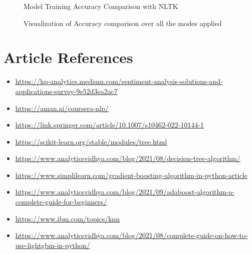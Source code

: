 \documentclass[a4paper]{article}
\theoremstyle{plain}
\theoremstyle{definition}
\begin{document}
\begin{figure}[htbp]
\begin{minipage}[b]{0.3\textwidth}
        \caption*{Model Training Accuracy Comparison with NLTK}
        \label{fig:figure5}
    \end{minipage}
    
    \caption{Visualization of Accuracy comparison over all the modes applied}
    \label{fig:dataset_figures}
\end{figure}
\cite{wang2014sentiment}
\cite{dang2020sentiment}
\cite{pang2002thumbs}
\cite{tang2014learning}

	

\section{{Article References}}

\begin{itemize}
    
    \item \url{https://hp-analytics.medium.com/sentiment-analysis-solutions-and-applications-survey-9e52d3ea2ac7}
    \item \url{https://aman.ai/coursera-nlp/}\item \url{https://link.springer.com/article/10.1007/s10462-022-10144-1}
    \item \url{https://scikit-learn.org/stable/modules/tree.html}
    \item \url{https://www.analyticsvidhya.com/blog/2021/08/decision-tree-algorithm/}
    \item \url{https://www.simplilearn.com/gradient-boosting-algorithm-in-python-article}
    \item \url{https://www.analyticsvidhya.com/blog/2021/09/adaboost-algorithm-a-complete-guide-for-beginners/}
    \item \url{https://www.ibm.com/topics/knn}
    \item \url{https://www.analyticsvidhya.com/blog/2021/08/complete-guide-on-how-to-use-lightgbm-in-python/}
\end{itemize}

	\appendix
	
\end{document}
